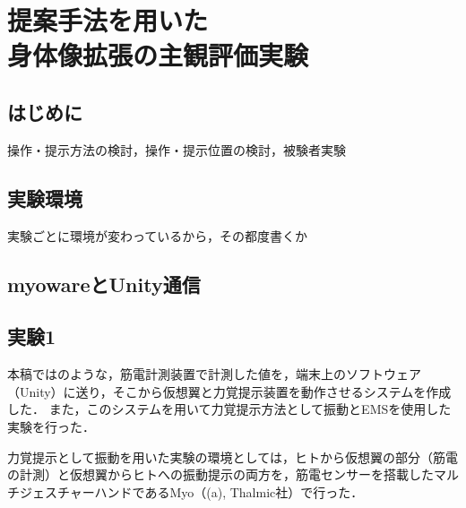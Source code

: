 \chapter[提案手法を用いた身体像拡張の主観評価実験]%
        {提案手法を用いた\\身体像拡張の主観評価実験}

\section{はじめに}
    操作・提示方法の検討，操作・提示位置の検討，被験者実験

\section{実験環境}
実験ごとに環境が変わっているから，その都度書くか

\section{myowareとUnity通信}

\section{}

\section{実験1}
    本稿ではのような，筋電計測装置で計測した値を，端末上のソフトウェア（Unity）に送り，そこから仮想翼と力覚提示装置を動作させるシステムを作成した．
    また，このシステムを用いて力覚提示方法として振動とEMSを使用した実験を行った．





    力覚提示として振動を用いた実験の環境としては，ヒトから仮想翼の部分（筋電の計測）と仮想翼からヒトへの振動提示の両方を，筋電センサーを搭載したマルチジェスチャーハンドであるMyo（(a), Thalmic社）で行った．

